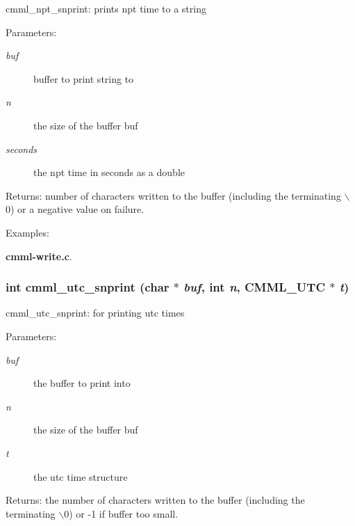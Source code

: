 cmml\_\-npt\_\-snprint: prints npt time to a string

\begin{Desc}
\item[Parameters:]
\begin{description}
\item[{\em buf}]buffer to print string to \item[{\em n}]the size of the buffer buf \item[{\em seconds}]the npt time in seconds as a double\end{description}
\end{Desc}
\begin{Desc}
\item[Returns:]number of characters written to the buffer (including the terminating $\backslash$0) or a negative value on failure. \end{Desc}
\begin{Desc}
\item[Examples: ]\par
{\bf cmml-write.c}.\end{Desc}
\subsubsection{\setlength{\rightskip}{0pt plus 5cm}int cmml\_\-utc\_\-snprint (char $\ast$ {\em buf}, int {\em n}, {\bf CMML\_\-UTC} $\ast$ {\em t})}\label{cmml_8h_a110}


cmml\_\-utc\_\-snprint: for printing utc times

\begin{Desc}
\item[Parameters:]
\begin{description}
\item[{\em buf}]the buffer to print into \item[{\em n}]the size of the buffer buf \item[{\em t}]the utc time structure\end{description}
\end{Desc}
\begin{Desc}
\item[Returns:]the number of characters written to the buffer (including the terminating $\backslash$0) or -1 if buffer too small. \end{Desc}
